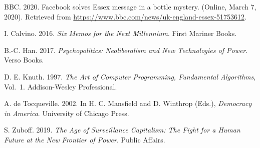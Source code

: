 \begin{thebibliography}{00}

 BBC. 2020. Facebook solves Essex message in a bottle mystery. (Online, March 7, 2020). Retrieved from \href{https://www.bbc.com/news/uk-england-essex-51753612}{https://{\allowbreak}www.{\allowbreak}bbc.{\allowbreak}com/{\allowbreak}news/{\allowbreak}uk-{\allowbreak}england-{\allowbreak}essex-{\allowbreak}51753612}.

 I. Calvino. 2016. \textit{Six Memos for the Next Millennium}. First Mariner Books.

 B.-C. Han. 2017. \textit{Psychopolitics: Neoliberalism and New Technologies of Power}. Verso Books.

 D. E. Knuth. 1997. \textit{The Art of Computer Programming, Fundamental Algorithms}, Vol.~1. Addison-Wesley Professional.

 A. de Tocqueville. 2002. In H. C. Mansfield and D. Winthrop (Eds.), \textit{Democracy in America}. University of Chicago Press.

 S. Zuboff. 2019. \textit{The Age of Surveillance Capitalism: The Fight for a Human Future at the New Frontier of Power}. Public Affairs.


\end{thebibliography}

%

